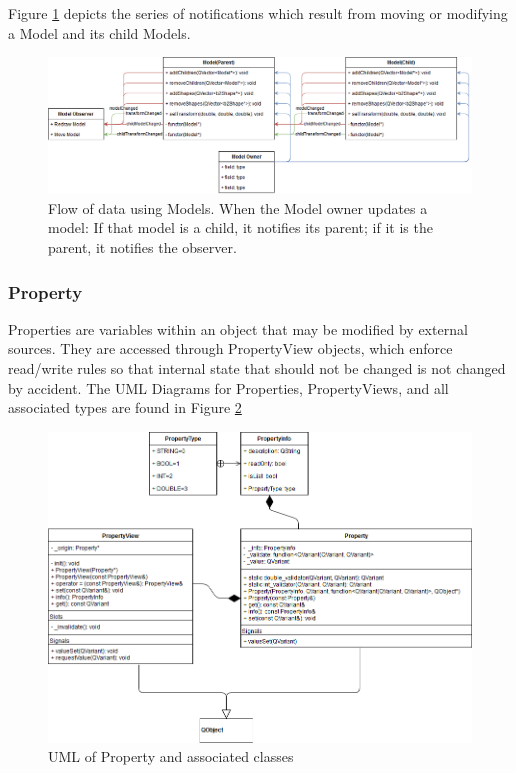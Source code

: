  Figure \ref{uml:dataflow_model} depicts the series of notifications which result from moving or modifying a Model and its child Models.
 \begin{figure}[h]
 	\begin{center}
 	\includegraphics[width=\textwidth]{./images_design/uml/DataFlow_Model}
 	\caption{Flow of data using Models. When the Model owner updates a model: If that model is a child, it notifies its parent; if it is the parent, it notifies the observer.\label{uml:dataflow_model}}
 	\end{center}
 \end{figure}   
 
 \subsubsection*{Property}
 	Properties are variables within an object that may be modified by external sources. They are accessed through PropertyView objects, which enforce read/write rules so that internal state that should not be changed is not changed by accident. The UML Diagrams for Properties, PropertyViews, and all associated types are found in Figure \ref{uml:property}
 	
 \begin{figure}[h!]
 	\begin{center}
 	\includegraphics[width=\textwidth]{./images_design/uml/Property}
 	\caption{UML of Property and associated classes\label{uml:property}}
 	\end{center}
 \end{figure} 
 
